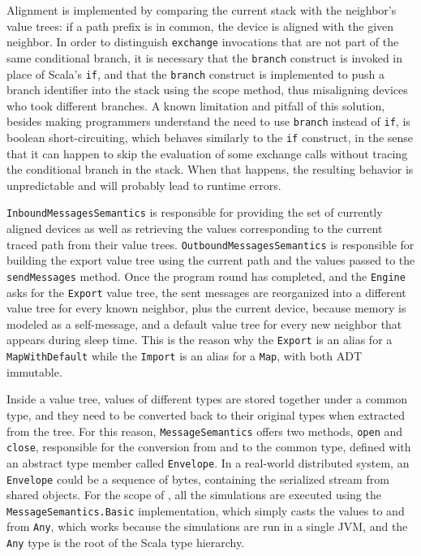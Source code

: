 Alignment is implemented by comparing the current stack with the neighbor's value trees: if a path prefix is in common, the device is aligned with the given neighbor.
%
In order to distinguish \texttt{exchange} invocations that are not part of the same conditional branch, it is necessary that the \texttt{branch} construct is invoked in place of Scala's \texttt{if}, and that the \texttt{branch} construct is implemented to push a branch identifier into the stack using the scope method, thus misaligning devices who took different branches.
%
A known limitation and pitfall of this solution, besides making programmers understand the need to use \texttt{branch} instead of \texttt{if}, is boolean short-circuiting, which behaves similarly to the \texttt{if} construct, in the sense that it can happen to skip the evaluation of some exchange calls without tracing the conditional branch in the stack.
%
When that happens, the resulting behavior is unpredictable and will probably lead to runtime errors.

\texttt{InboundMessagesSemantics} is responsible for providing the set of currently aligned devices as well as retrieving the values corresponding to the current traced path from their value trees.
%
\texttt{OutboundMessagesSemantics} is responsible for building the export value tree using the current path and the values passed to the \texttt{sendMessages} method.
%
Once the program round has completed, and the \texttt{Engine} asks for the \texttt{Export} value tree, the sent messages are reorganized into a different value tree for every known neighbor, plus the current device, because memory is modeled as a self-message, and a default value tree for every new neighbor that appears during sleep time.
%
This is the reason why the \texttt{Export} is an alias for a \texttt{MapWithDefault} while the \texttt{Import} is an alias for a \texttt{Map}, with both \ac{ADT} immutable.

Inside a value tree, values of different types are stored together under a common type, and they need to be converted back to their original types when extracted from the tree.
%
For this reason, \texttt{MessageSemantics} offers two methods, \texttt{open} and \texttt{close}, responsible for the conversion from and to the common type, defined with an abstract type member called \texttt{Envelope}.
%
In a real-world distributed system, an \texttt{Envelope} could be a sequence of bytes, containing the serialized stream from shared objects.
%
For the scope of \this, all the simulations are executed using the \texttt{MessageSemantics.Basic} implementation, which simply casts the values to and from \texttt{Any}, which works because the simulations are run in a single JVM, and the \texttt{Any} type is the root of the Scala type hierarchy.

